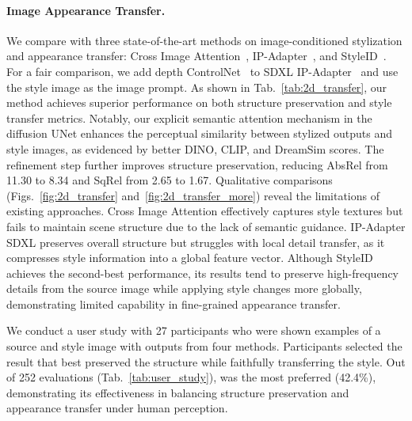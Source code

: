 \paragraph{\bf{Image Appearance Transfer.}}
We compare with three state-of-the-art methods on image-conditioned stylization and appearance transfer: Cross Image Attention~\cite{alaluf2024cross}, IP-Adapter~\cite{ye2023ip}, and StyleID~\cite{chung2024styleid}. For a fair comparison, we add depth ControlNet~\cite{zhang2023adding} to SDXL IP-Adapter~\cite{ye2023ip} and use the style image as the image prompt. As shown in Tab.~\ref{tab:2d_transfer}, our method achieves superior performance on both structure preservation and style transfer metrics. Notably, our explicit semantic attention mechanism in the diffusion UNet enhances the perceptual similarity between stylized outputs and style images, as evidenced by better DINO, CLIP, and DreamSim scores. The refinement step further improves structure preservation, reducing AbsRel from 11.30 to 8.34 and SqRel from 2.65 to 1.67.
Qualitative comparisons (Figs.~\ref{fig:2d_transfer} and~\ref{fig:2d_transfer_more}) reveal the limitations of existing approaches. Cross Image Attention effectively captures style textures but fails to maintain scene structure due to the lack of semantic guidance. IP-Adapter SDXL preserves overall structure but struggles with local detail transfer, as it compresses style information into a global feature vector. Although StyleID achieves the second-best performance, its results tend to preserve high-frequency details from the source image while applying style changes more globally, demonstrating limited capability in fine-grained appearance transfer.

We conduct a user study with 27 participants who were shown examples of a source and style image with outputs from four methods.
Participants selected the result that best preserved the structure while faithfully transferring the style.
Out of 252 evaluations (Tab.~\ref{tab:user_study}), \ours was the most preferred (42.4\%), demonstrating its effectiveness in balancing structure preservation and appearance transfer under human perception.






